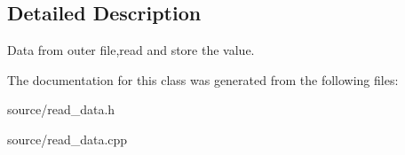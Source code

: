 \subsection{Detailed Description}
Data from outer file,read and store the value. 

The documentation for this class was generated from the following files\-:\begin{DoxyCompactItemize}
\item 
source/read\-\_\-data.\-h\item 
source/read\-\_\-data.\-cpp\end{DoxyCompactItemize}
